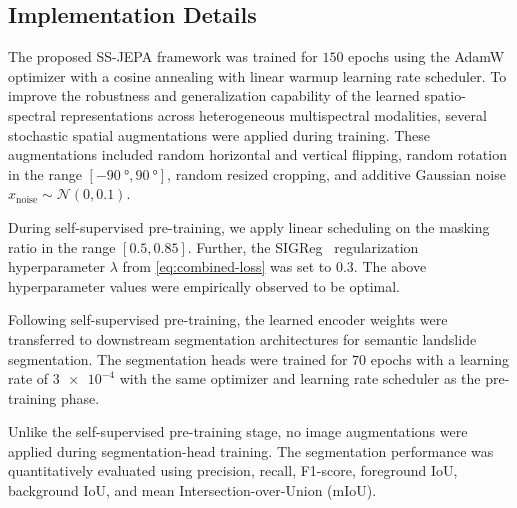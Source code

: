 \subsection{Implementation Details}
\label{sec:impl-det}

The proposed SS-JEPA framework was trained for \( 150 \) epochs using the AdamW optimizer with a cosine annealing with linear warmup learning rate scheduler. To improve the robustness and generalization capability of the learned spatio-spectral representations across heterogeneous multispectral modalities, several stochastic spatial augmentations were applied during training. These augmentations included random horizontal and vertical flipping, random rotation in the range \([\qty{-90}{\degree}, \qty{90}{\degree}]\), random resized cropping, and additive Gaussian noise \( x_\mathrm{noise} \sim \mathcal{N}(0, 0.1) \).

During self-supervised pre-training, we apply linear scheduling on the masking ratio in the range \( [0.5, 0.85] \). Further, the SIGReg~\cite{balestriero2025lejepaprovablescalableselfsupervised} regularization hyperparameter \( \lambda \) from \cref{eq:combined-loss} was set to \( 0.3 \). The above hyperparameter values were empirically observed to be optimal.



Following self-supervised pre-training, the learned encoder weights were transferred to downstream segmentation architectures for semantic landslide segmentation. The segmentation heads were trained for \( 70 \) epochs with a learning rate of \( \num{3e-4} \) with the same optimizer and learning rate scheduler as the pre-training phase.

Unlike the self-supervised pre-training stage, no image augmentations were applied during segmentation-head training. The segmentation performance was quantitatively evaluated using precision, recall, F1-score, foreground IoU, background IoU, and mean Intersection-over-Union (mIoU).
